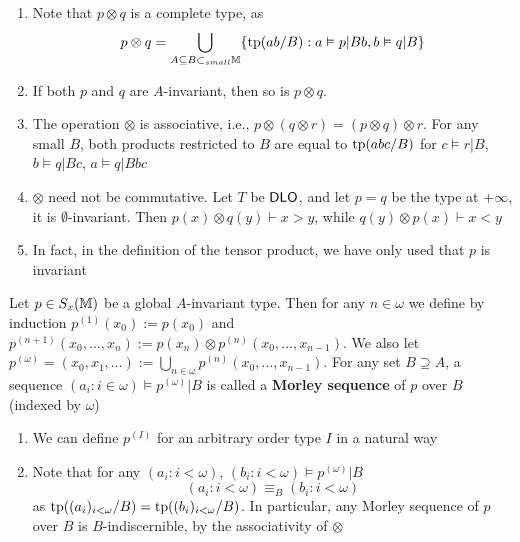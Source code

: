 \documentclass[11pt]{article}
\begin{document}
\begin{remark}
\begin{enumerate}
\item Note that \(p\otimes q\) is a complete type, as
\begin{equation*}
p\otimes q=\bigcup_{A\subseteq B\subset_{small}\mathbb{M}}\{\operatorname{tp}(ab/B):a\vDash p|Bb,b\vDash q|B\}
\end{equation*}
\item If both \(p\) and \(q\) are \(A\)-invariant, then so is \(p\otimes q\).
\item The operation \(\otimes\) is associative, i.e., \(p\otimes(q\otimes r)=(p\otimes q)\otimes r\). For any small \(B\), both
products restricted to \(B\) are equal to \(\operatorname{tp}(abc/B)\)
for \(c\vDash r|B\), \(b\vDash q|Bc\), \(a\vDash q|Bbc\)
\item \(\otimes\) need not be commutative. Let \(T\) be \(\operatorname{\textsf{DLO}}\), and let \(p=q\) be the type at \(+\infty\),
it is \(\emptyset\)-invariant. Then \(p(x)\otimes q(y)\vdash x>y\), while \(q(y)\otimes p(x)\vdash x<y\)
\item In fact, in the definition of the tensor product, we have only used that \(p\) is invariant
\end{enumerate}
\end{remark}

\begin{definition}[]
Let \(p\in S_x(\mathbb{M})\) be a global \(A\)-invariant type. Then for any \(n\in\omega\) we define by
induction \(p^{(1)}(x_0):=p(x_0)\) and \(p^{(n+1)}(x_0,\dots,x_n):=p(x_n)\otimes p^{(n)}(x_0,\dots,x_{n-1})\).
We also let \(p^{(\omega)}=(x_0,x_1,\dots):=\bigcup_{n\in\omega}p^{(n)}(x_0,\dots,x_{n-1})\). For any set \(B\supseteq A\), a
sequence \((a_i:i\in\omega)\vDash p^{(\omega)}|B\) is called a \textbf{Morley sequence} of \(p\) over \(B\) (indexed by \(\omega\))
\end{definition}

\begin{remark}
\begin{enumerate}
\item We can define \(p^{(I)}\) for an arbitrary order type \(I\) in a natural way
\item Note that for any \((a_i:i<\omega)\), \((b_i:i<\omega)\vDash p^{(\omega)}|B\)
\begin{equation*}
(a_i:i<\omega)\equiv_B(b_i:i<\omega)
\end{equation*}
as \(\operatorname{tp}((a_i)_{i<\omega}/B)=\operatorname{tp}((b_i)_{i<\omega}/B)\). In particular, any Morley sequence of \(p\)
over \(B\) is \(B\)-indiscernible, by the associativity of \(\otimes\)
\end{enumerate}
\end{remark}
\end{document}
